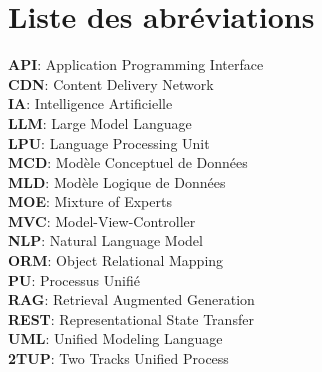 \thispagestyle{empty}

\chapter*{Liste des abréviations}

\noindent
\vspace{0.5em}
\textbf{API}: Application Programming Interface \\
\vspace{0.5em}
\textbf{CDN}: Content Delivery Network \\
\vspace{0.5em}
\textbf{IA}: Intelligence Artificielle\\ 
\vspace{0.5em}
\textbf{LLM}: Large Model Language \\
\vspace{0.5em}
\textbf{LPU}: Language Processing Unit \\
\vspace{0.5em}
\textbf{MCD}: Modèle Conceptuel de Données \\ 
\vspace{0.5em}
\textbf{MLD}: Modèle Logique de Données \\
\vspace{0.5em}
\textbf{MOE}: Mixture of Experts \\
\vspace{0.5em}
\textbf{MVC}: Model-View-Controller \\
\vspace{0.5em}
\textbf{NLP}: Natural Language Model \\
\vspace{0.5em}
\textbf{ORM}: Object Relational Mapping \\
\vspace{0.5em}
\textbf{PU}: Processus Unifié \\
\vspace{0.5em}
\textbf{RAG}: Retrieval Augmented Generation \\
\vspace{0.5em}
\textbf{REST}: Representational State Transfer \\
\vspace{0.5em}
\textbf{UML}: Unified Modeling Language \\
\vspace{0.5em}
\textbf{2TUP}: Two Tracks Unified Process\\
